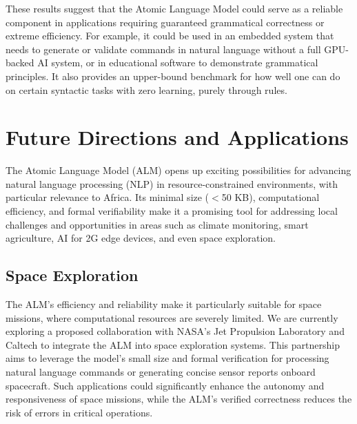 \documentclass[11pt]{article}
\begin{document}
These results suggest that the Atomic Language Model could serve as a reliable component in applications requiring guaranteed grammatical correctness or extreme efficiency. For example, it could be used in an embedded system that needs to generate or validate commands in natural language without a full GPU-backed AI system, or in educational software to demonstrate grammatical principles. It also provides an upper-bound benchmark for how well one can do on certain syntactic tasks with zero learning, purely through rules.

\section{Future Directions and Applications}
The Atomic Language Model (ALM) opens up exciting possibilities for advancing natural language processing (NLP) in resource-constrained environments, with particular relevance to Africa. Its minimal size ($<$50 KB), computational efficiency, and formal verifiability make it a promising tool for addressing local challenges and opportunities in areas such as climate monitoring, smart agriculture, AI for 2G edge devices, and even space exploration.

\subsection*{Space Exploration}
The ALM's efficiency and reliability make it particularly suitable for space missions, where computational resources are severely limited. We are currently exploring a proposed collaboration with NASA's Jet Propulsion Laboratory and Caltech to integrate the ALM into space exploration systems. This partnership aims to leverage the model's small size and formal verification for processing natural language commands or generating concise sensor reports onboard spacecraft. Such applications could significantly enhance the autonomy and responsiveness of space missions, while the ALM's verified correctness reduces the risk of errors in critical operations.
\end{document}
